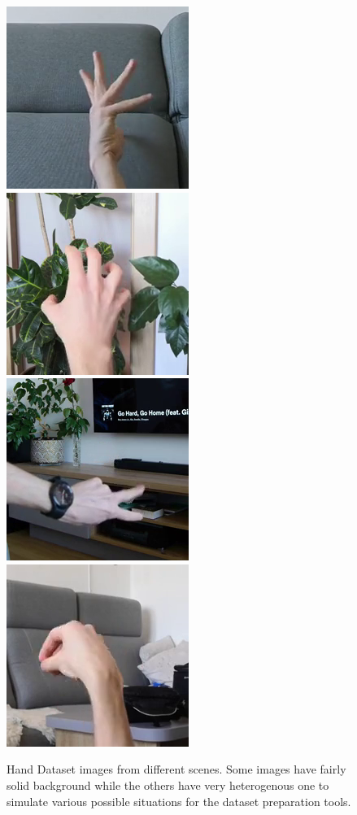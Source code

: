 \begin{figure}[!ht]
{    }
    \vspace{0.1cm}
    \centerline{
        \includegraphics[scale=0.46]{figures/dataset_hand/scene007_cam2_image00028.png}
        \includegraphics[scale=0.46]{figures/dataset_hand/scene008_cam1_image00024.png}
        \includegraphics[scale=0.46]{figures/dataset_hand/scene009_cam0_image00010.png}
        \includegraphics[scale=0.46]{figures/dataset_hand/scene010_cam1_image00019.png}
    }
    \caption{Hand Dataset images from different scenes. Some images have fairly solid background while the others have very heterogenous one to simulate various possible situations for the dataset preparation tools.}
    \label{fig:dataset-hand-simple-example}
\end{figure}

